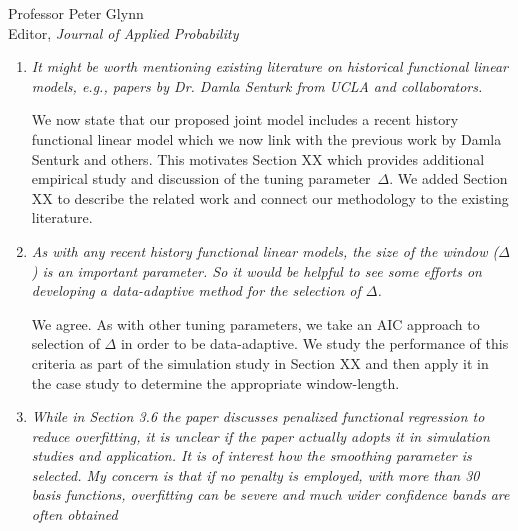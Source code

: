 \documentclass[11pt]{letter} %
\begin{document}
\begin{letter}{Professor
	Peter Glynn\\
	Editor, {\em Journal of Applied Probability}}
\begin{enumerate}
\vspace{5mm}
We have added a detailed discussion of related work in Section 1.1, which includes the specific suggestions on relevant works provided by the second referee; specifically, we discuss recent modeling of time-to-event data with functional covariates as well as joint modelling from a functional regression perspective.  We contrast these approaches with our design-based approach which becomes necessary when considering high-frequency sensor processes rather than traditional longitudinal studies as the number of measurement occasions increase from tens to thousands/millions of times per individual.  We connect and contrast our use of subsampling with the general use of subsampling in handling massive data and its recent use in massive data with functional predictors.
\vspace{5mm}

\item {\it It might be worth mentioning existing literature on historical functional linear models, e.g., papers by Dr. Damla Senturk from UCLA and collaborators.}

\vspace{5mm}
We now state that our proposed joint model includes a recent history functional linear model which we now link with the previous work by Damla Senturk and others.  This motivates Section XX which provides additional empirical study and discussion of the tuning parameter~$\Delta$.
We added Section XX to describe the related work and connect our methodology to the existing literature.
\vspace{5mm}

\item {\it As with any recent history functional linear models, the size of the window ($\Delta$) is an important parameter. So it would be helpful to see some efforts on developing a data-adaptive method for the selection of $\Delta$.}

\vspace{5mm}
We agree.  As with other tuning parameters, we take an AIC approach to selection of $\Delta$ in order to be data-adaptive.  We study the performance of this criteria as part of the simulation study in Section XX and then apply it in the case study to determine the appropriate window-length.
\vspace{5mm}

\item {\it While in Section 3.6 the paper discusses penalized functional regression to reduce overfitting, it is unclear if the paper actually adopts it in simulation studies and application. It is of interest how the smoothing parameter is selected. My concern is that if no penalty is employed, with more than 30 basis functions, overfitting can be severe and much wider confidence bands are often obtained}


\end{enumerate}
\end{letter}
\end{document}

